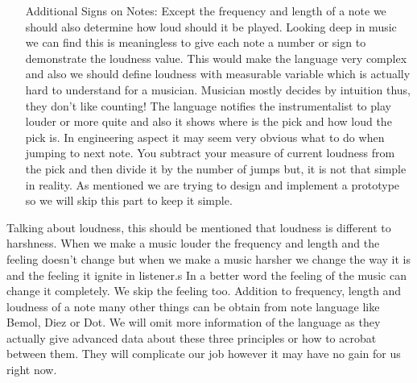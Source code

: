 \documentclass{report}
\begin{document}
\begin{itemize}
\item[Additional Signs on Notes: ]{Except the frequency and length of a note we should also determine how loud should it be played. Looking deep in music we can find this is meaningless to give each note a number or sign to demonstrate the loudness value. This would make the language very complex and also we should define loudness with measurable variable which is actually hard to understand for a musician. Musician mostly decides by intuition thus, they don't like counting! The language notifies the instrumentalist to play louder or more quite and also it shows where is the pick and how loud the pick is. In engineering aspect it may seem very obvious what to do when jumping to next note. You subtract your measure of current loudness from the pick and then divide it by the number of jumps but, it is not that simple in reality. As mentioned we are trying to design and implement a prototype so we will skip this part to keep it simple. }
\end{itemize} 
Talking about loudness, this should be mentioned that loudness is different to harshness. When we make a music louder the frequency and length and the feeling doesn't change but when we make a music harsher we change the way it is and the feeling it ignite in listener.s In a better word the feeling of the music can change it completely. We skip the feeling too.\newline
Addition to frequency, length and loudness of a note many other things can be obtain from note language like Bemol, Diez or Dot. We will omit more information of the language as they actually give advanced data about these three principles or how to acrobat between them. They will complicate our job however it may have no gain for us right now.

\end{document}
